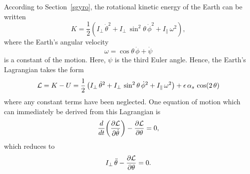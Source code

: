 According to Section~\ref{sgyro}, the rotational kinetic
energy of the Earth can be written
\begin{equation}\label{e13.96}
K = \frac{1}{2}\left(I_\perp\,\dot{\theta}^2 + I_\perp\,\sin^2\theta\,\dot{\phi}^2 + I_\parallel\,\omega^2\right),
\end{equation}
where the Earth's angular velocity
\begin{equation}\label{e13.97}
\omega = \cos\theta\,\dot{\phi} + \dot{\psi}
\end{equation}
is a constant of the motion.
Here, $\psi$ is the third Euler angle.
Hence, the Earth's Lagrangian takes the form
\begin{equation}\label{e13.98}
{\cal L} = K - U = \frac{1}{2}\left(I_\perp\,\dot{\theta}^2 + I_\perp\,\sin^2\theta\,\dot{\phi}^2 + I_\parallel\,\omega^2\right) +\epsilon\,\alpha_s\,\cos(2\,\theta)
\end{equation}
where any constant terms have been neglected. 
One equation of motion which can immediately be derived from this Lagrangian is
\begin{equation}
\frac{d}{dt}\!\left(\frac{\partial{\cal  L}}{\partial \dot{\theta}}\right)- \frac{\partial {\cal L}}{\partial\theta} = 0,
\end{equation}
which reduces to
\begin{equation}
I_\perp\,\ddot{\theta} - \frac{\partial {\cal  L}}{\partial \theta} = 0.
\end{equation}

